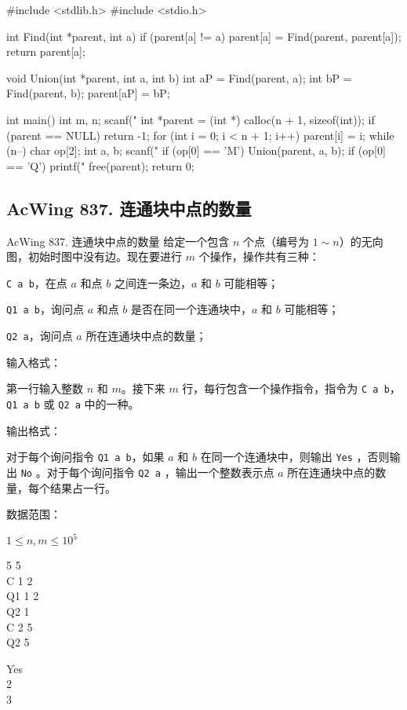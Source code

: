 \begin{mycpptwocol}[合并集合]
#include <stdlib.h>
#include <stdio.h>

int Find(int *parent, int a)
{
    if (parent[a] != a) {
        parent[a] = Find(parent, parent[a]);
    }
    return parent[a];
}

void Union(int *parent, int a, int b)
{
    int aP = Find(parent, a);
    int bP = Find(parent, b);
    parent[aP] = bP;
}

int main()
{
    int m, n;
    scanf("%
    int *parent = (int *) calloc(n + 1, sizeof(int));
    if (parent == NULL) {
        return -1;
    }
    for (int i = 0; i < n + 1; i++) {
        parent[i] = i;
    }
    while (n--) {
        char op[2];
        int a, b;
        scanf("%
        if (op[0] == 'M') {
            Union(parent, a, b);
        }
        if (op[0] == 'Q') {
            printf("%
        }
    }
    free(parent);
    return 0;
}
\end{mycpptwocol}
\subsection{AcWing 837. 连通块中点的数量}

\begin{titledbox}{AcWing 837. 连通块中点的数量}
给定一个包含 $n$ 个点（编号为 $1 \sim n$）的无向图，初始时图中没有边。现在要进行 $m$ 个操作，操作共有三种：

\lstinline{C a b}，在点 $a$ 和点 $b$ 之间连一条边，$a$ 和 $b$ 可能相等；

\lstinline{Q1 a b}，询问点 $a$ 和点 $b$ 是否在同一个连通块中，$a$ 和 $b$ 可能相等；

\lstinline{Q2 a}，询问点 $a$ 所在连通块中点的数量；

输入格式：

第一行输入整数 $n$ 和 $m$。接下来 $m$ 行，每行包含一个操作指令，指令为 \lstinline{C a b}，\lstinline{Q1 a b} 或 \lstinline{Q2 a} 中的一种。

输出格式：

对于每个询问指令 \lstinline{Q1 a b}，如果 $a$ 和 $b$ 在同一个连通块中，则输出 \lstinline{Yes} ，否则输出 \lstinline{No} 。对于每个询问指令 \lstinline{Q2 a} ，输出一个整数表示点 $a$ 所在连通块中点的数量，每个结果占一行。

数据范围：

$1 \le n,m \le 10^5$
    
\begin{inputblock}
    5 5 \\
    C 1 2 \\
    Q1 1 2 \\
    Q2 1 \\
    C 2 5 \\
    Q2 5
\end{inputblock}
\begin{outputblock}
    Yes \\
    2 \\
    3
\end{outputblock}
\end{titledbox}

